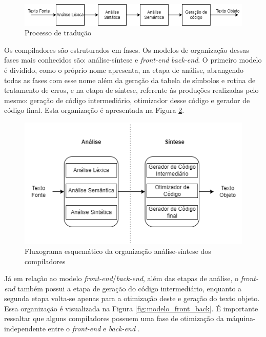 \documentclass[12pt]{article}
\begin{document}
\begin{figure}[ht]
\includegraphics[scale=0.75]{Imagens/traducao.png}
\caption{Processo de tradução}
\label{fig:processo_traducao}
\end{figure}

Os compiladores são estruturados em fases. Os modelos de organização dessas fases mais conhecidos são: análise-síntese e \textit{front-end} \textit{back-end}. O primeiro modelo é dividido, como o próprio nome apresenta, na etapa de análise, abrangendo todas as fases com esse nome além da geração da tabela de símbolos e rotina de tratamento de erros, e na etapa de síntese, referente às produções realizadas pelo mesmo: geração de código intermediário, otimizador desse código e gerador de código final. Esta organização é apresentada na Figura \ref{fig:modelo_analise_sintese}.


\begin{figure}[ht]
    \centering
    \includegraphics[scale=0.6]{Imagens/modelos_organizacionais_compiladores-analise_sintese.drawio.png}
    \caption{Fluxograma esquemático da organização análise-síntese dos compiladores}
    \label{fig:modelo_analise_sintese}
\end{figure}



Já em relação ao modelo \textit{front-end}/\textit{back-end}, além das etapas de análise, o \textit{front-end} também possui a etapa de geração do código intermediário, enquanto a segunda etapa volta-se apenas para a otimização deste e geração do texto objeto. Essa organização é visualizada na Figura \ref{fig:modelo_front_back}.
É importante ressaltar que alguns compiladores possuem uma fase de otimização da máquina-independente entre o \textit{front-end} e \textit{back-end} \cite{book_compilers}.
\end{document}
